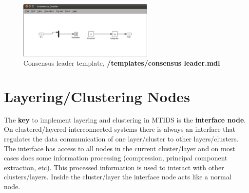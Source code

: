\documentclass[a4paper,twoside, openright,12pt]{report}
\begin{document}
\begin{figure}[htb]
\centering
\includegraphics[width=0.6\textwidth]{pics/consensus_leader_template.eps}
\caption[MTIDS Consensus Leader Template]{Consensus leader template, \textbf{/templates/consensus leader.mdl}}
\label{templateConsensusLeaderFig}
\end{figure}

%

\section{Layering/Clustering Nodes} \label{layering}


The \textbf{key} to implement layering and clustering in MTIDS is the \textbf{interface node}. On clustered/layered interconnected systems there is always an interface
that regulates the data communication of one layer/cluster to other layers/clusters. The interface has access to all nodes in the current cluster/layer and 
on most cases does some information processing (compression, principal component extraction, etc). This processed information is used to interact with 
other clusters/layers. Inside the cluster/layer the interface node acts like a normal node.
\\
\end{document}

